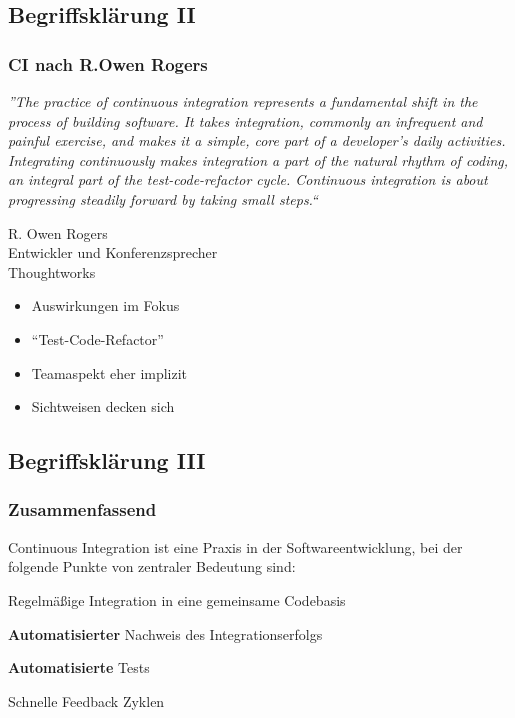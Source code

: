 \documentclass[hyperref={pdfpagelabels=false}]{beamer}
\begin{document}
\subsection{Begriffsklärung II}
\begin{frame} [t]
\frametitle{CI nach R.Owen Rogers}
 {
\begin{center}
\textit{”The practice of continuous integration represents a fundamental shift in the process of building software. It takes integration, commonly
an infrequent and painful exercise, and makes it a simple, core part of a developer’s daily activities. Integrating continuously makes integration a part of the natural rhythm of coding, an integral part of the test-code-refactor cycle. Continuous integration is about progressing steadily forward by taking small steps.“}
\end{center}
\vspace{0.5cm} 
\begin{flushright}
\footnotesize{R. Owen Rogers\\ Entwickler und Konferenzsprecher\\ Thoughtworks}
\end{flushright}
}
 {
\vspace{0.5cm} 
\begin{multicols}{2}
\begin{itemize}
	\item Auswirkungen im Fokus
	\item "`Test-Code-Refactor"'
	\item Teamaspekt eher implizit
	\item Sichtweisen decken sich
\end{itemize}
\end{multicols}
}
\end{frame}

\subsection{Begriffsklärung III}
\begin{frame} [t]
\frametitle{Zusammenfassend}
 {
Continuous Integration ist eine Praxis in der Softwareentwicklung, bei der folgende Punkte von zentraler Bedeutung sind:
}
\vspace{0.5cm} 
\begin{itemize}
 {
	\item Regelmäßige Integration in eine gemeinsame Codebasis
}
 {
	\item \textbf{Automatisierter} Nachweis des Integrationserfolgs
}
 {
	\item \textbf{Automatisierte} Tests
}
 {
	\item Schnelle Feedback Zyklen
}
\end{itemize}
\end{frame}
\end{document}
